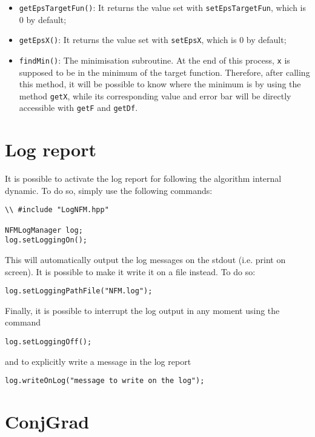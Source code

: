 \documentclass[11pt,a4paper,twoside]{article}
\begin{document}
\begin{itemize}
\item \verb+getEpsTargetFun()+: It returns the value set with \verb+setEpsTargetFun+, which is $0$ by default;
\item \verb+getEpsX()+: It returns the value set with \verb+setEpsX+, which is $0$ by default;
\item \verb+findMin()+: The minimisation subroutine. At the end of this process, \verb+x+ is supposed to be in the minimum of the target function. Therefore, after calling this method, it will be possible to know where the minimum is by using the method \verb+getX+, while its corresponding value and error bar will be directly accessible with \verb+getF+ and \verb+getDf+.
\end{itemize}





\section{Log report} %
\label{sec:log_output}

It is possible to activate the log report for following the algorithm internal dynamic.
To do so, simply use the following commands:

\begin{lstlisting}
\\ #include "LogNFM.hpp"

NFMLogManager log;
log.setLoggingOn();
\end{lstlisting}

This will automatically output the log messages on the stdout (i.e. print on screen).
It is possible to make it write it on a file instead.
To do so:

\begin{lstlisting}
log.setLoggingPathFile("NFM.log");
\end{lstlisting}

Finally, it is possible to interrupt the log output in any moment using the command
\begin{lstlisting}
log.setLoggingOff();
\end{lstlisting}
and to explicitly write a message in the log report
\begin{lstlisting}
log.writeOnLog("message to write on the log");
\end{lstlisting}




\section{ConjGrad} %
\label{sec:conjgrad}
\end{document}
